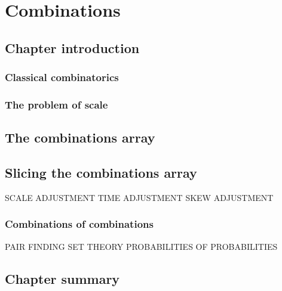 \chapter{Combinations}
\section{Chapter introduction}
\subsection{Classical combinatorics}
\subsection{The problem of scale}
\section{The combinations array}
\section{Slicing the combinations array}
SCALE ADJUSTMENT
TIME ADJUSTMENT
SKEW ADJUSTMENT
\subsection{Combinations of combinations}
PAIR FINDING
SET THEORY
PROBABILITIES OF PROBABILITIES
\section{Chapter summary}
